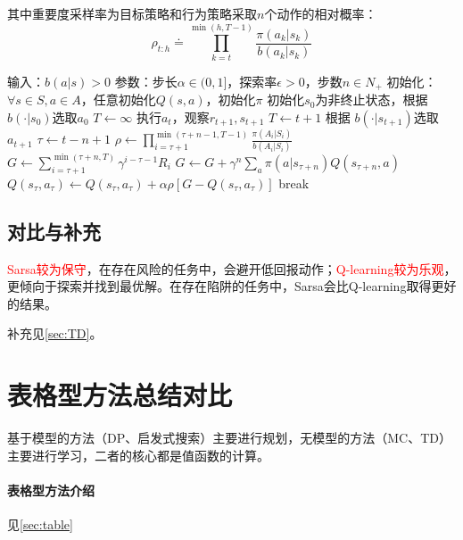 \documentclass[
12pt, %
a4paper, 
oneside, %
]{scrartcl}
\begin{document}
其中重要度采样率为目标策略和行为策略采取$ n $个动作的相对概率：
$$ \rho_{t:h} \doteq \prod_{k = t}^{\min(h, T - 1)} \frac{\pi(a_k|s_k)}{b(a_k|s_k)} $$
\begin{myalgorithm}
\State 输入：$ b(a|s) > 0 $
\State 参数：步长$ \alpha \in (0, 1] $，探索率$ \epsilon > 0 $，步数$ n \in N_+ $
\State 初始化：$ \forall s \in S, a \in A $，任意初始化$ Q(s, a) $，初始化$ \pi $
\State 初始化$ s_0 $为非终止状态，根据$ b(\cdot|s_0) $选取$ a_0 $
\State $ T \gets \infty $
\State 执行$ a_t $，观察$ r_{t + 1}, s_{t + 1} $
\State $ T \gets t + 1 $
\Else
\State 根据 $ b(\cdot|s_{t + 1}) $选取$ a_{t + 1} $
\EndIf
\EndIf
\State $ \tau \gets t - n + 1 $ 
\State $ \rho \gets \prod_{i = \tau + 1}^{\min(\tau + n - 1,T - 1)} \frac{\pi(A_i|S_i)}{b(A_i|S_i)}$ 
\State $ G \gets \sum_{i = \tau + 1}^{\min(\tau + n, T)} \gamma^{i - \tau - 1}R_i $
\State $ G \gets G + \gamma^n \sum_a \pi(a|s_{\tau + n})Q(s_{\tau + n}, a)$ 
\EndIf
\State $ Q(s_{\tau}, a_{\tau}) \gets Q(s_{\tau}, a_{\tau}) + \alpha \rho[G - Q(s_{\tau}, a_{\tau})] $
\EndIf
{}
\State break
\EndIf
\EndFor
\EndFor
\end{myalgorithm}
\subsection[对比与补充]{对比与补充}\label{sec:TD back}
\textcolor{red}{Sarsa较为保守}，在存在风险的任务中，会避开低回报动作；\textcolor{red}{Q-learning较为乐观}，更倾向于探索并找到最优解。在存在陷阱的任务中，Sarsa会比Q-learning取得更好的结果。

补充见\ref{sec:TD}。
\section{表格型方法总结对比}
基于模型的方法（DP、启发式搜索）主要进行规划，无模型的方法（MC、TD）主要进行学习，二者的核心都是值函数的计算。
\paragraph{表格型方法介绍}\label{sec:table back}
见\ref{sec:table}
\end{document}
